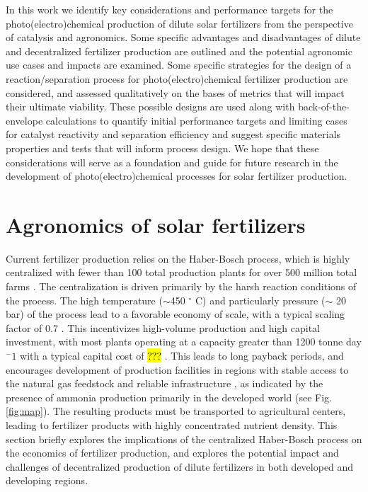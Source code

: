 In this work we identify key considerations and performance targets for the photo(electro)chemical production of dilute solar fertilizers from the perspective of catalysis and agronomics. Some specific advantages and disadvantages of dilute and decentralized fertilizer production are outlined and the potential agronomic use cases and impacts are examined. Some specific strategies for the design of a reaction/separation process for photo(electro)chemical fertilizer production are considered, and assessed qualitatively on the bases of metrics that will impact their ultimate viability. These possible designs are used along with back-of-the-envelope calculations to quantify initial performance targets and limiting cases for catalyst reactivity and separation efficiency and suggest specific materials properties and tests that will inform process design. We hope that these considerations will serve as a foundation and guide for future research in the development of photo(electro)chemical processes for solar fertilizer production.

\section{Agronomics of solar fertilizers}

Current fertilizer production relies on the Haber-Bosch process, which is highly centralized with fewer than 100 total production plants \cite{McArthur_2017} for over 500 million total farms \cite{FAO_2014,Lowder_2016}. The centralization is driven primarily by the harsh reaction conditions of the process. The high temperature ($\sim$450 $^\circ$ C) and particularly pressure ($\sim$ 20 bar) of the process lead to a favorable economy of scale, with a typical scaling factor of 0.7 \cite{Ullmann_amm_2006}. This incentivizes high-volume production and high capital investment, with most plants operating at a capacity greater than 1200 tonne day$^-1$ with a typical capital cost of \hl{???} \cite{Ullmann_amm_2006}. This leads to long payback periods, and encourages development of production facilities in regions with stable access to the natural gas feedstock and reliable infrastructure \cite{McArthur_2017}, as indicated by the presence of ammonia production primarily in the developed world (see Fig. \ref{fig:map}). The resulting products must be transported to agricultural centers, leading to fertilizer products with highly concentrated nutrient density. This section briefly explores the implications of the centralized Haber-Bosch process on the economics of fertilizer production, and explores the potential impact and challenges of decentralized production of dilute fertilizers in both developed and developing regions.

